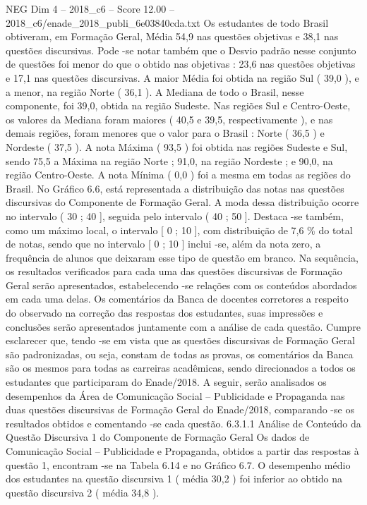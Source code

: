 \begin{textsample}{NEG Dim 4 – 2018\_c6 – Score 12.00 – 2018\_c6/enade\_2018\_publi\_6e03840cda.txt}
Os estudantes de todo Brasil obtiveram, em Formação Geral, Média 54,9 nas questões objetivas e 38,1 nas questões discursivas.
Pode -se notar também que o Desvio padrão nesse conjunto de questões foi menor do que o obtido nas objetivas : 23,6 nas questões objetivas e 17,1 nas questões discursivas.
A maior Média foi obtida na região Sul ( 39,0 ), e a menor, na região Norte ( 36,1 ).
A Mediana de todo o Brasil, nesse componente, foi 39,0, obtida na região Sudeste.
Nas regiões Sul e Centro-Oeste, os valores da Mediana foram maiores ( 40,5 e 39,5, respectivamente ), e nas demais regiões, foram menores que o valor para o Brasil : Norte ( 36,5 ) e Nordeste ( 37,5 ).
A nota Máxima ( 93,5 ) foi obtida nas regiões Sudeste e Sul, sendo 75,5 a Máxima na região Norte ; 91,0, na região Nordeste ; e 90,0, na região Centro-Oeste.
A nota Mínima ( 0,0 ) foi a mesma em todas as regiões do Brasil.
No Gráfico 6.6, está representada a distribuição das notas nas questões discursivas do Componente de Formação Geral.
A moda dessa distribuição ocorre no intervalo ( 30 ; 40 ], seguida pelo intervalo ( 40 ; 50 ].
Destaca -se também, como um máximo local, o intervalo [ 0 ; 10 ], com distribuição de 7,6 \% do total de notas, sendo que no intervalo [ 0 ; 10 ] inclui -se, além da nota zero, a frequência de alunos que deixaram esse tipo de questão em branco.
Na sequência, os resultados verificados para cada uma das questões discursivas de Formação Geral serão apresentados, estabelecendo -se relações com os conteúdos abordados em cada uma delas.
Os comentários da Banca de docentes corretores a respeito do observado na correção das respostas dos estudantes, suas impressões e conclusões serão apresentados juntamente com a análise de cada questão.
Cumpre esclarecer que, tendo -se em vista que as questões discursivas de Formação Geral são padronizadas, ou seja, constam de todas as provas, os comentários da Banca são os mesmos para todas as carreiras acadêmicas, sendo direcionados a todos os estudantes que participaram do Enade/2018.
A seguir, serão analisados os desempenhos da Área de Comunicação Social – Publicidade e Propaganda nas duas questões discursivas de Formação Geral do Enade/2018, comparando -se os resultados obtidos e comentando -se cada questão. 6.3.1.1 Análise de Conteúdo da Questão Discursiva 1 do Componente de Formação Geral Os dados de Comunicação Social – Publicidade e Propaganda, obtidos a partir das respostas à questão 1, encontram -se na Tabela 6.14 e no Gráfico 6.7.
O desempenho médio dos estudantes na questão discursiva 1 ( média 30,2 ) foi inferior ao obtido na questão discursiva 2 ( média 34,8 ).

\end{textsample}
